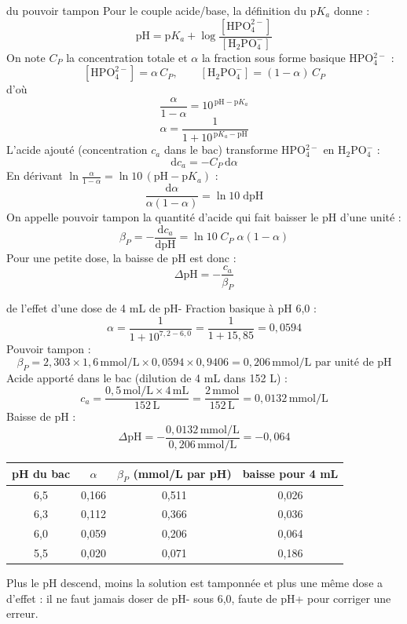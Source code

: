 \documentclass[11pt,a4paper]{article}
\newcommand{\U}[1]{\,\mathrm{#1}}
\begin{document}
\begin{calcul}{du pouvoir tampon}
Pour le couple acide/base, la définition du p$K_a$ donne :
\[ \mathrm{pH} = \mathrm{p}K_a + \log\frac{[\mathrm{HPO_4^{2-}}]}{[\mathrm{H_2PO_4^-}]} \]
On note $C_P$ la concentration totale et $\alpha$ la fraction sous forme basique HPO$_4^{2-}$ :
\[ [\mathrm{HPO_4^{2-}}] = \alpha\,C_P, \qquad [\mathrm{H_2PO_4^-}] = (1-\alpha)\,C_P \]
d'où
\[ \frac{\alpha}{1-\alpha} = 10^{\,\mathrm{pH}-\mathrm{p}K_a} \]
\[ \alpha = \frac{1}{1 + 10^{\,\mathrm{p}K_a - \mathrm{pH}}} \]
L'acide ajouté (concentration $c_a$ dans le bac) transforme HPO$_4^{2-}$ en H$_2$PO$_4^-$ :
\[ \mathrm{d}c_a = -C_P\,\mathrm{d}\alpha \]
En dérivant $\ln\frac{\alpha}{1-\alpha} = \ln10\,(\mathrm{pH}-\mathrm{p}K_a)$ :
\[ \frac{\mathrm{d}\alpha}{\alpha(1-\alpha)} = \ln10\;\mathrm{d}\mathrm{pH} \]
On appelle pouvoir tampon la quantité d'acide qui fait baisser le pH d'une unité :
\[ \beta_P = -\frac{\mathrm{d}c_a}{\mathrm{d}\mathrm{pH}} = \ln10\;C_P\;\alpha(1-\alpha) \]
Pour une petite dose, la baisse de pH est donc :
\[ \Delta\mathrm{pH} = -\frac{c_a}{\beta_P} \]
\end{calcul}

\begin{calcul}{de l'effet d'une dose de 4 mL de pH-}
Fraction basique à pH 6,0 :
\[ \alpha = \frac{1}{1+10^{7{,}2-6{,}0}} = \frac{1}{1+15{,}85} = 0{,}0594 \]
Pouvoir tampon :
\[ \beta_P = 2{,}303\times1{,}6\U{mmol/L}\times0{,}0594\times0{,}9406 = 0{,}206\U{mmol/L} \text{ par unité de pH} \]
Acide apporté dans le bac (dilution de 4 mL dans 152 L) :
\[ c_a = \frac{0{,}5\U{mol/L}\times4\U{mL}}{152\U{L}} = \frac{2\U{mmol}}{152\U{L}} = 0{,}0132\U{mmol/L} \]
Baisse de pH :
\[ \Delta\mathrm{pH} = -\frac{0{,}0132\U{mmol/L}}{0{,}206\U{mmol/L}} = -0{,}064 \]
\end{calcul}

\begin{center}
\begin{tabular}{cccc}
\toprule
pH du bac & $\alpha$ & $\beta_P$ (mmol/L par pH) & baisse pour 4 mL \\
\midrule
6,5 & 0,166 & 0,511 & 0,026 \\
6,3 & 0,112 & 0,366 & 0,036 \\
6,0 & 0,059 & 0,206 & 0,064 \\
5,5 & 0,020 & 0,071 & 0,186 \\
\bottomrule
\end{tabular}
\end{center}

Plus le pH descend, moins la solution est tamponnée et plus une même dose a d'effet : il ne faut jamais doser de pH- sous 6,0, faute de pH+ pour corriger une erreur.
\end{document}
